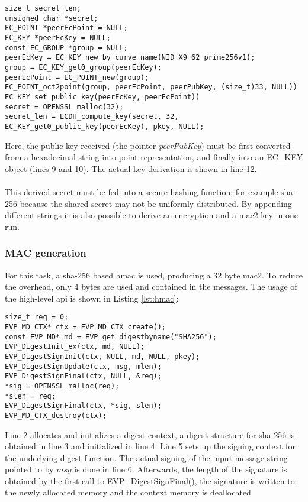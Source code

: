 \begin{lstlisting}[style=cStyle,caption={Deriving a shared secret},label=lst:derive]
size_t secret_len;
unsigned char *secret;
EC_POINT *peerEcPoint = NULL;
EC_KEY *peerEcKey = NULL;
const EC_GROUP *group = NULL;
peerEcKey = EC_KEY_new_by_curve_name(NID_X9_62_prime256v1);       
group = EC_KEY_get0_group(peerEcKey);
peerEcPoint = EC_POINT_new(group);
EC_POINT_oct2point(group, peerEcPoint, peerPubKey, (size_t)33, NULL))
EC_KEY_set_public_key(peerEcKey, peerEcPoint))
secret = OPENSSL_malloc(32);
secret_len = ECDH_compute_key(secret, 32, EC_KEY_get0_public_key(peerEcKey), pkey, NULL);
\end{lstlisting}
Here, the public key received (the pointer \textit{peerPubKey}) must be first converted from a hexadecimal string into point representation, and finally into an EC\_KEY object
(lines 9 and 10). The actual key derivation is shown in line 12.
\\
\\
This derived secret must be fed into a secure hashing function, for example \gls{sha}-256 because the shared secret may not be uniformly distributed. By appending different strings
it is also possible to derive an encryption and a \gls{mac2} key in one run.

\subsubsection{MAC generation}
For this task, a \gls{sha}-256 based \gls{hmac} is used, producing a 32 byte \gls{mac2}. To reduce the overhead, only 4 bytes are used and contained in the messages. The usage of
the high-level \gls{api} is shown in Listing \ref{lst:hmac}:
\begin{lstlisting}[style=cStyle,caption={Generating a \gls{hmac}},label=lst:hmac]
size_t req = 0;
EVP_MD_CTX* ctx = EVP_MD_CTX_create();
const EVP_MD* md = EVP_get_digestbyname("SHA256");
EVP_DigestInit_ex(ctx, md, NULL);
EVP_DigestSignInit(ctx, NULL, md, NULL, pkey);
EVP_DigestSignUpdate(ctx, msg, mlen);
EVP_DigestSignFinal(ctx, NULL, &req);
*sig = OPENSSL_malloc(req);
*slen = req;
EVP_DigestSignFinal(ctx, *sig, slen);
EVP_MD_CTX_destroy(ctx);
\end{lstlisting}
Line 2 allocates and initializes a digest context, a digest structure for \gls{sha}-256 is obtained in line 3 and initialized in line 4. Line 5 sets up the signing context for the
underlying digest function. The actual signing of the input message string pointed to by $msg$ is done in line 6. Afterwards, the length of the signature is obtained by the first call
to EVP\_DigestSignFinal(), the signature is written to the newly allocated memory and the context memory is deallocated


